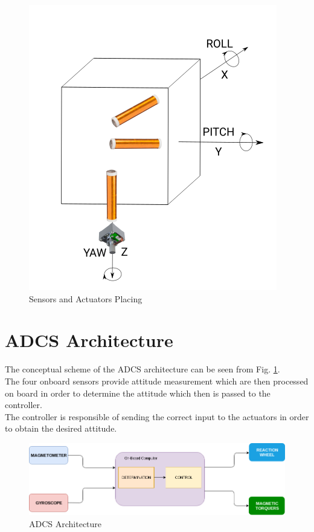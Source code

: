\documentclass[11pt,a4paper]{report}
\begin{document}
\begin{figure}[H]
 	\centering
 	\includegraphics[scale=0.4]{gfx/actuators.png}
    \caption{Sensors and Actuators Placing}
\end{figure}

\section{ADCS Architecture}
The conceptual scheme of the ADCS architecture can be seen from Fig. \ref{fig:architecture}.\\
The four onboard sensors provide attitude measurement which are then processed on board in order to determine the attitude which then is passed to the controller.\\
The controller is responsible of sending the correct input to the actuators in order to obtain the desired attitude.

\begin{figure}[H]
 	\centering
 	\includegraphics[scale=0.5]{gfx/adcs.png}
    \caption{ADCS Architecture}
    \label{fig:architecture}
\end{figure}
\end{document}
